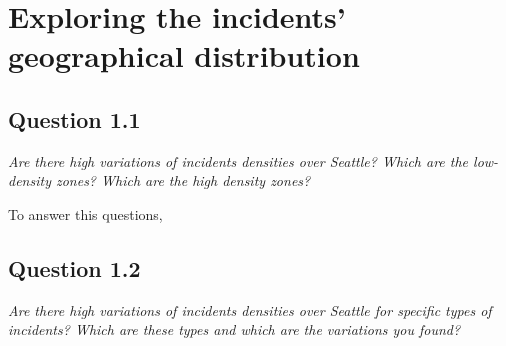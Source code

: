 \section{Exploring the incidents' geographical distribution}

\subsection*{Question 1.1}
\textit{Are there high variations of incidents densities over Seattle? Which are the low-density zones? Which are the high density zones?}

To answer this questions, 

\subsection*{Question 1.2}
\textit{Are there high variations of incidents densities over Seattle for specific types of incidents? Which are these types and which are the variations you found?}
